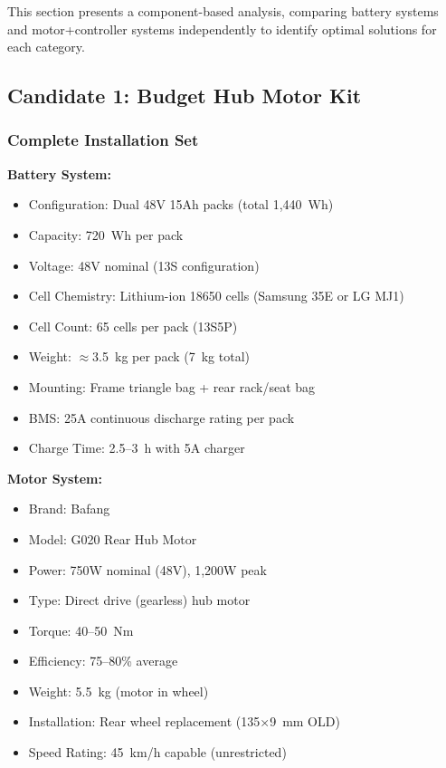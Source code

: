 \documentclass[12pt,a4paper]{article}
\begin{document}
This section presents a component-based analysis, comparing battery systems and motor+controller systems independently to identify optimal solutions for each category.

\subsection{Candidate 1: Budget Hub Motor Kit}

\subsubsection{Complete Installation Set}

\textbf{Battery System:}
\begin{itemize}
    \item Configuration: Dual 48V 15Ah packs (total 1,440~Wh)
    \item Capacity: 720~Wh per pack
    \item Voltage: 48V nominal (13S configuration)
    \item Cell Chemistry: Lithium-ion 18650 cells (Samsung 35E or LG MJ1) \cite{samsung-35e, lg-mj1}
    \item Cell Count: 65 cells per pack (13S5P)
    \item Weight: $\approx$3.5~kg per pack (7~kg total)
    \item Mounting: Frame triangle bag + rear rack/seat bag
    \item BMS: 25A continuous discharge rating per pack
    \item Charge Time: 2.5--3~h with 5A charger
\end{itemize}

\textbf{Motor System:}
\begin{itemize}
    \item Brand: Bafang
    \item Model: G020 Rear Hub Motor \cite{bafang-g020}
    \item Power: 750W nominal (48V), 1,200W peak
    \item Type: Direct drive (gearless) hub motor
    \item Torque: 40--50~Nm
    \item Efficiency: 75--80\% average
    \item Weight: 5.5~kg (motor in wheel)
    \item Installation: Rear wheel replacement (135×9~mm OLD)
    \item Speed Rating: 45~km/h capable (unrestricted)
\end{itemize}
\end{document}
